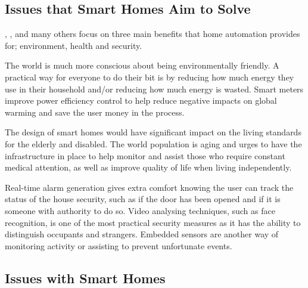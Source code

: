 \documentclass[final]{cmpreport}
\begin{document}
    \subsection{Issues that Smart Homes Aim to Solve} 

    \cite{futureofsmarthomes}, \cite{smarthomecomms}, \cite{iotehs} and many others focus on three main benefits that home automation provides for; environment, health and security.

    The world is much more conscious about being environmentally friendly. A practical way for everyone to do their bit is by reducing how much energy they use in their household and/or reducing how much energy is wasted. Smart meters improve power efficiency control to help reduce negative impacts on global warming and save the user money in the process.

    The design of smart homes would have significant impact on the living standards for the elderly and disabled. The world population is aging and urges to have the infrastructure in place to help monitor and assist those who require constant medical attention, as well as improve quality of life when living independently.

    Real-time alarm generation gives extra comfort knowing the user can track the status of the house security, such as if the door has been opened and if it is someone with authority to do so. Video analysing techniques, such as face recognition, is one of the most practical security measures as it has the ability to distinguish occupants and strangers. Embedded sensors are another way of monitoring activity or assisting to prevent unfortunate events. 

    \subsection{Issues with Smart Homes}
\end{document}
